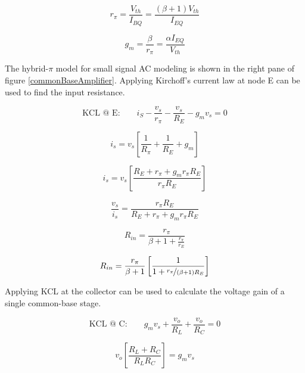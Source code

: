 \documentclass[titlepage, letterpaper, 10.5pt]{article}
\begin{document}
\begin{equation}
r_{\pi}=\frac{V_{th}}{I_{BQ}}
=\frac{(\beta+1)V_{th}}{I_{EQ}}
\label{rPi}
\end{equation}

\begin{equation}
g_{m}=\frac{\beta}{r_{\pi}}
=\frac{\alpha I_{EQ}}{V_{th}}
\label{gm}
\end{equation}

The hybrid-$\pi$ model for small signal AC modeling is shown in the
right pane of figure \ref{commonBaseAmplifier}. Applying Kirchoff's
current law at node E can be used to find the input resistance.

\begin{equation*}
\textrm{KCL @ E:}\qquad
i_{S}-\frac{v_{s}}{r_{\pi}}-\frac{v_{s}}{R_{E}}-g_{m}v_{s}=0
\end{equation*}

\begin{equation*}
i_{s}=v_{s} \left[ \frac{1}{R_{\pi}}+\frac{1}{R_{E}}+g_{m} \right]
\end{equation*}

\begin{equation*}
i_{s}=v_{s} \left[
\frac{R_{E}+r_{\pi}+g_{m}r_{\pi}R_{E}}
{r_{\pi}R_{E}} \right]
\end{equation*}

\begin{equation*}
\frac{v_{s}}{i_{s}}
=\frac{r_{\pi}R_{E}}{R_{E}+r_{\pi}+g_{m}r_{\pi}R_{E}}
\end{equation*}

\begin{equation*}
R_{in}=\frac{r_{\pi}}{\beta+1+\frac{r_{\pi}}{r_{E}}}
\end{equation*}

\begin{equation}
R_{in}=\frac{r_{\pi}}{\beta+1}
\left[\frac{1}{1+\nicefrac{r_{\pi}}{(\beta+1)R_{E}}}\right]
\label{commonBaseRin}
\end{equation}

Applying KCL at the collector can be used to calculate the voltage
gain of a single common-base stage.

\begin{equation*}
\textrm{KCL @ C:}\qquad
g_{m}v_{s}+\frac{v_{o}}{R_{L}}+\frac{v_{o}}{R_{C}}=0
\end{equation*}

\begin{equation*}
v_{o}\left[\frac{R_{L}+R_{C}}{R_{L}R_{C}}\right]=g_{m}v_{s}
\end{equation*}
\end{document}
